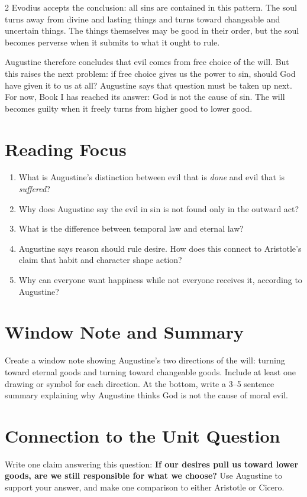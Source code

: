 \documentclass[12pt]{article}
\begin{document}
\begin{multicols}{2}
Evodius accepts the conclusion: all sins are contained in this pattern. The soul turns away from divine and lasting things and turns toward changeable and uncertain things. The things themselves may be good in their order, but the soul becomes perverse when it submits to what it ought to rule.

Augustine therefore concludes that evil comes from free choice of the will. But this raises the next problem: if free choice gives us the power to sin, should God have given it to us at all? Augustine says that question must be taken up next. For now, Book I has reached its answer: God is not the cause of sin. The will becomes guilty when it freely turns from higher good to lower good.

\section*{Reading Focus}
\begin{enumerate}[leftmargin=*]
\item What is Augustine's distinction between evil that is \textit{done} and evil that is \textit{suffered}?
\item Why does Augustine say the evil in sin is not found only in the outward act?
\item What is the difference between temporal law and eternal law?
\item Augustine says reason should rule desire. How does this connect to Aristotle's claim that habit and character shape action?
\item Why can everyone want happiness while not everyone receives it, according to Augustine?
\end{enumerate}

\section*{Window Note and Summary}
Create a window note showing Augustine's two directions of the will: turning toward eternal goods and turning toward changeable goods. Include at least one drawing or symbol for each direction. At the bottom, write a 3--5 sentence summary explaining why Augustine thinks God is not the cause of moral evil.

\section*{Connection to the Unit Question}
Write one claim answering this question: \textbf{If our desires pull us toward lower goods, are we still responsible for what we choose?} Use Augustine to support your answer, and make one comparison to either Aristotle or Cicero.
\end{multicols}
\end{document}

